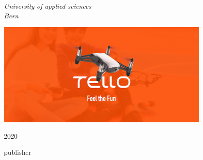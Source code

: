 \begin{titlepage}
	\vspace{0.5\baselineskip} %

	\textit{University of applied sciences \\ Bern} %

	\vfill %


	\begin{center}
	\includegraphics[width=0.8\textwidth]{./resources/01_front_image.png}
	\end{center}

	\vspace{0.3\baselineskip} %

	2020 %

	{\large publisher} %

\end{titlepage}
